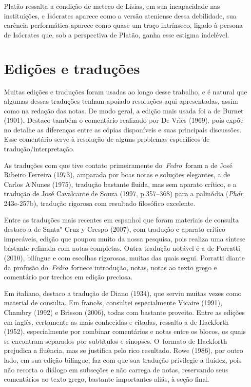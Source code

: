 Platão ressalta a condição de meteco de Lísias, em sua incapacidade nas
instituições, e Isócrates aparece como a versão ateniense dessa
debilidade, sua carência performática aparece como quase um traço
intrínseco, ligado à persona de Isócrates que, sob a perspectiva de
Platão, ganha esse estigma indelével.

 

\section{Edições e traduções}

 

Muitas edições e traduções foram usadas ao longo desse trabalho, e é
natural que algumas dessas traduções tenham apoiado resoluções aqui
apresentadas, assim como na redação das notas. De modo geral, a edição
mais usada foi a de Burnet (1901). Destaco também o comentário realizado
por De Vries (1969), pois expõe no detalhe as diferenças entre as cópias
disponíveis e suas principais discussões. Esse comentário serve à
resolução de alguns problemas específicos de tradução/\allowbreak{}interpretação.

As traduções com que tive contato primeiramente do~\emph{Fedro}~foram a de
José Ribeiro Ferreira (1973), amparada por boas notas e soluções
elegantes, a de Carlos A\,Nunes (1975), tradução bastante fluida, mas
sem aparato crítico, e a tradução de José Cavalcante de Souza (1997,
p.357--368) para a palinódia (\emph{Phdr}. 243e-257b), tradução rigorosa
com resultado filosófico excelente.

Entre as traduções mais recentes em espanhol que foram materiais de
consulta destaco a de Santa"-Cruz y Crespo (2007), com tradução e aparato
crítico impecáveis, edição que poupou muito da nossa pesquisa, pois
realiza uma síntese bastante refinada com notas completas. Outra
tradução notável é a de Porratti (2010), bilíngue e com escolhas
rigorosas, muitas das quais segui. Porratti diante da profusão
do~\emph{Fedro}~fornece introdução, notas, notas ao texto grego e
comentário por trechos em edição preciosa.

Em italiano, destaco a tradução de Diano (1934), que serviu muitas vezes
como material de consulta. Em francês, consultei especialmente Vicaire
(1991), Chambry (1992) e Brisson (2006), todas com bastante proveito.
Entre as edições em inglês, certamente as mais conhecidas e citadas,
ressalto a de Hackforth (1952), especialmente por combinar comentários e
notas entre os blocos, os quais se encontram separados por subtítulos e
sinopses. O~formato de Hackforth prejudica a fluência, mas se justifica
pelo rico resultado. Rowe (1986), por outro lado, em sua edição bilíngue,
faz com que sua tradução privilegie a fluidez, pois não recorta o
diálogo em subseções e não carrega de notas, reservando seus comentários
ao texto grego, bastante importantes aliás, à seção final.


